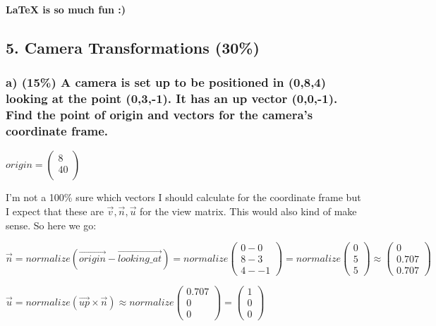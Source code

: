 \textbf{LaTeX is so much fun :)}

\newpage

\subsection{5.  Camera Transformations (30\%)} 
\subsubsection{a)  (15\%) A camera is set up to be positioned in (0,8,4) looking at the point (0,3,-1). It has an up vector (0,0,-1). Find the point of origin and vectors for the camera's coordinate frame.}

$
    origin
=
    \left(\begin{array}{c}
        8\\
        4
        0\\
    \end{array}\right)
$

I'm not a 100\% sure which vectors I should calculate for the coordinate frame but I expect that these are $ \vec{v}, \vec{n}, \vec{u} $ for the view matrix. This would also kind of make sense. So here we go:

$ 
    \vec{n}
=
    normalize(\vec{origin} - \vec{looking\_at})
=
    normalize\left(\begin{array}{c}
        0 - 0 \\
        8 - 3 \\
        4 - -1
    \end{array}\right) 
= 
    normalize\left(\begin{array}{c}
        0 \\
        5 \\
        5
    \end{array}\right)
\approx
    \left(\begin{array}{c}
        0\\
        0.707\\
        0.707
    \end{array}\right)
$

$
    \vec{u}
=
    normalize\left( \vec{up} \times \vec{n} \right)
\approx
    normalize\left(\begin{array}{c}
        0.707\\
        0\\
        0
    \end{array}\right)
=
    \left(\begin{array}{c}
        1\\
        0\\
        0
    \end{array}\right)
$

